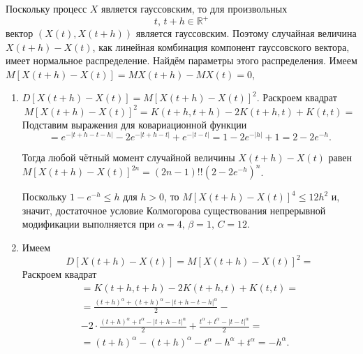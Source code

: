Поскольку процесс $X$ является гауссовским, то для произвольных
$$t, \, t + h \in \mathbb{R}^+$$
вектор $ \left( X \left( t \right), X \left( t + h \right) \right) $ является гауссовским.
Поэтому случайная величина $X \left( t + h \right) - X \left( t \right) $,
как линейная комбинация компонент гауссовского вектора, имеет нормальное распределение.
Найдём параметры этого распределения.
Имеем
$M \left[ X \left( t + h \right) - X \left( t \right) \right] =
  MX \left( t + h \right) - MX \left( t \right) =
  0$,
\begin{enumerate}[label=\alph*)]
  \item $D \left[ X \left( t + h \right) - X \left( t \right) \right] =
    M \left[ X \left( t + h \right) - X \left( t \right) \right]^2.$
  Раскроем квадрат
  $$M \left[ X \left( t + h \right) - X \left( t \right) \right]^2 =
    K \left( t + h, t + h \right) - 2K \left( t + h, t \right) + K \left( t, t \right) =$$
  Подставим выражения для ковариационной функции
  $$= e^{-\left| t + h - t - h \right| } - 2e^{-\left| t + h - t \right| } +
    e^{-\left| t - t \right| } =
    1 - 2e^{-\left| h \right| } + 1 =
    2 - 2e^{-h}.$$

  Тогда любой чётный момент случайной величины $X \left( t + h \right) - X \left( t \right) $ равен
  $M \left[ X \left( t + h \right) - X \left( t \right) \right]^{2n} =
    \left( 2n - 1 \right)!! \left( 2 - 2e^{-h} \right)^n$.

  Поскольку $1 - e^{-h} \leq h$ для $h > 0$,
  то $M \left[ X \left( t + h \right) - X \left( t \right) \right]^4 \leq 12h^2$ и, значит,
  достаточное условие Колмогорова существования непрерывной модификации выполняется при
  $ \alpha = 4, \,
    \beta = 1, \,
    C = 12$.
  \item Имеем
  $$D \left[ X \left( t + h \right) - X \left( t \right) \right] =
    M \left[ X \left( t + h \right) - X \left( t \right) \right]^2 =$$
  Раскроем квадрат
  \begin{gather*}
    = K \left( t + h, t + h \right) - 2K \left( t + h, t \right) + K \left( t, t \right) = \\
    = \frac{\left(t+h\right)^{\alpha}+\left(t+h\right)^{\alpha}-\left|t+h-t-h\right|^{\alpha}}{2}- \\
    - 2\cdot\frac{\left(t+h\right)^{\alpha}+t^{\alpha}-\left|t+h-t\right|^{\alpha}}{2} +
    \frac{t^{ \alpha } + t^{ \alpha } - \left| t - t \right|^{ \alpha }}{2} = \\
    = \left( t + h \right)^{ \alpha } - \left( t + h \right)^{ \alpha } - t^{ \alpha } -
    h^{ \alpha } + t^{ \alpha } =
    -h^{ \alpha }.
  \end{gather*}


\end{enumerate}
